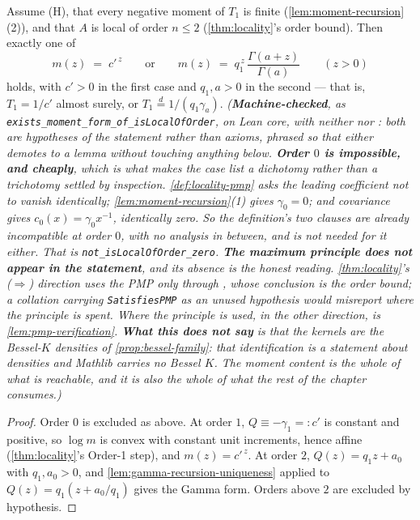 \begin{lemma}
\label{lem:local-moment-classification}
\leanok
Assume (H), that every negative moment of $T_1$ is finite (\ref{lem:moment-recursion}(2)), and
that $A$ is local of order $n \le 2$ (\ref{thm:locality}'s order bound). Then exactly one of
\[
  m(z) \;=\; c'^{\,z}
  \qquad\text{or}\qquad
  m(z) \;=\; q_1^{\,z}\,\frac{\Gamma(a+z)}{\Gamma(a)}
  \qquad (z > 0)
\]
holds, with $c' > 0$ in the first case and $q_1, a > 0$ in the second --- that is,
$T_1 = 1/c'$ almost surely, or $T_1 \stackrel{d}{=} 1/(q_1\gamma_a)$.
\statusT\quad\emph{(\textbf{Machine-checked}, as
\texttt{exists\_moment\_form\_of\_isLocalOfOrder}, on Lean core, with \emph{neither}  nor
: both are hypotheses of the statement rather than axioms, phrased so that either
demotes to a lemma without touching anything below.
\textbf{Order $0$ is impossible, and cheaply}, which is what makes the case list a dichotomy
rather than a trichotomy settled by inspection. \ref{def:locality-pmp} asks the leading
coefficient not to vanish identically; \ref{lem:moment-recursion}(1) gives $\gamma_0 = 0$; and
covariance gives $c_0(x) = \gamma_0 x^{-1}$, identically zero. So the definition's two clauses are
already incompatible at order $0$, with no analysis in between, and  is not needed for
it either. That is \texttt{not\_isLocalOfOrder\_zero}.
\textbf{The maximum principle does not appear in the statement}, and its absence is the honest
reading. \ref{thm:locality}'s ($\Rightarrow$) direction uses the PMP \emph{only} through
, whose conclusion is the order bound; a collation carrying \texttt{SatisfiesPMP} as
an unused hypothesis would misreport where the principle is spent. Where the principle \emph{is}
used, in the other direction, is \ref{lem:pmp-verification}.
\textbf{What this does not say} is that the kernels are the Bessel-$K$ densities of
\ref{prop:bessel-family}: that identification is a statement about densities and Mathlib carries
no Bessel $K$. The moment content is the whole of what is reachable, and it is also the whole of
what the rest of the chapter consumes.)}
\end{lemma}

\begin{proof}
\leanok
{}
Order $0$ is excluded as above. At order $1$, $Q \equiv -\gamma_1 =: c'$ is constant and positive,
so $\log m$ is convex with constant unit increments, hence affine (\ref{thm:locality}'s Order-1
step), and $m(z) = c'^{\,z}$. At order $2$, $Q(z) = q_1 z + a_0$ with $q_1, a_0 > 0$, and
\ref{lem:gamma-recursion-uniqueness} applied to $Q(z) = q_1(z + a_0/q_1)$ gives the Gamma form.
Orders above $2$ are excluded by hypothesis.
\end{proof}
